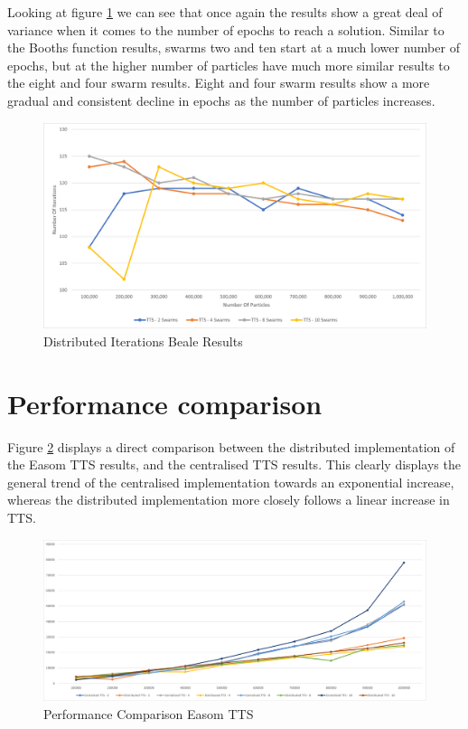 \documentclass[oneside,12pt]{book}
\begin{document}
Looking at figure \ref{fig:Distributed_Epoc_Beale_Results} we can see that once again the results show a great deal of variance when it comes to the number of epochs to reach a solution. Similar to the Booths function results, swarms two and ten start at a much lower number of epochs, but at the higher number of particles have much more similar results to the eight and four swarm results. Eight and four swarm results show a more gradual and consistent decline in epochs as the number of particles increases. 

\begin{figure}[H]
    \centering
    \includegraphics[scale=0.45]{Images/Graphs/DistributedBealeEpoch.png}
    \caption{Distributed Iterations Beale Results}
    \label{fig:Distributed_Epoc_Beale_Results}
\end{figure}

\section{Performance comparison}
Figure \ref{fig:PerformanceComparisonEasomTTS} displays a direct comparison between the distributed implementation of the Easom TTS results, and the centralised TTS results. This clearly displays the general trend of the centralised implementation towards an exponential increase, whereas the distributed implementation more closely follows a linear increase in TTS.  
\begin{figure}[H]
    \centering
    \includegraphics[scale=0.45]{Images/Graphs/PerformanceComparisonEasomTTS.png}
    \caption{Performance Comparison Easom TTS}
    \label{fig:PerformanceComparisonEasomTTS}
\end{figure}
\end{document}
